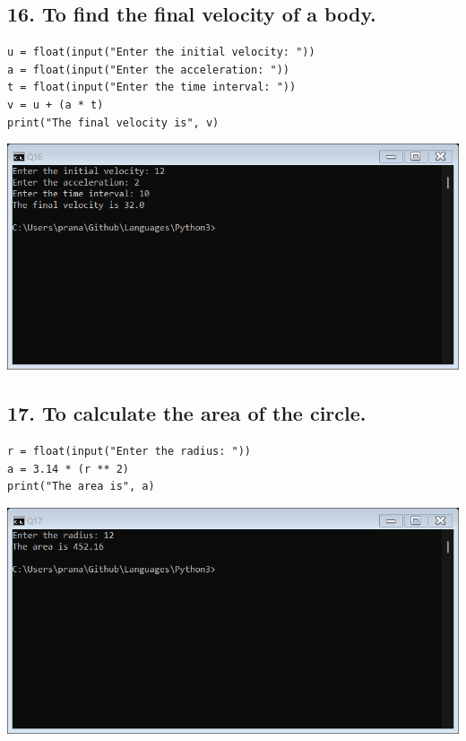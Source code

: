 \documentclass[12pt]{article}
\begin{document}
\subsection*{16. To find the final velocity of a body.}
\begin{verbatim}
u = float(input("Enter the initial velocity: "))
a = float(input("Enter the acceleration: "))
t = float(input("Enter the time interval: "))
v = u + (a * t)
print("The final velocity is", v)
\end{verbatim}
\includegraphics[width=\linewidth]{images/16.png}

\subsection*{17. To calculate the area of the circle.}
\begin{verbatim}
r = float(input("Enter the radius: "))
a = 3.14 * (r ** 2)
print("The area is", a)
\end{verbatim}
\includegraphics[width=\linewidth]{images/17.png}
\end{document}
